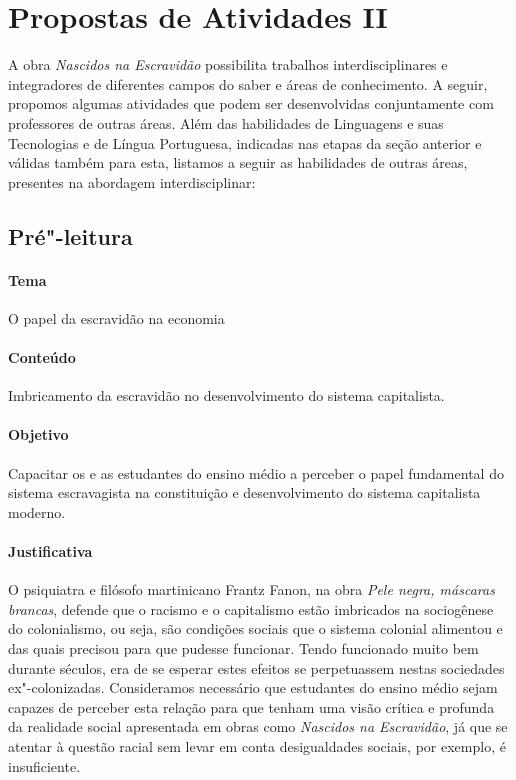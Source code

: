 \documentclass[11pt]{extarticle}
\begin{document}


\section{Propostas de Atividades II}

A obra \emph{Nascidos na Escravidão} possibilita trabalhos
interdisciplinares e integradores de diferentes campos do saber e áreas
de conhecimento. A seguir, propomos algumas atividades que podem ser
desenvolvidas conjuntamente com professores de outras áreas. Além das
habilidades de Linguagens e suas Tecnologias e de Língua Portuguesa,
indicadas nas etapas da seção anterior e válidas também para esta,
listamos a seguir as habilidades de outras áreas, presentes na abordagem
interdisciplinar:

\subsection{Pré"-leitura}

\paragraph{Tema} O papel da escravidão na economia

\paragraph{Conteúdo} Imbricamento da escravidão no desenvolvimento do sistema capitalista.

\paragraph{Objetivo} Capacitar os e as estudantes do ensino médio a perceber o papel fundamental
do sistema escravagista na constituição e desenvolvimento do sistema capitalista moderno.

\paragraph{Justificativa} O psiquiatra e filósofo martinicano Frantz Fanon, na obra \emph{Pele negra,
máscaras brancas}, defende que o racismo e o capitalismo estão imbricados na sociogênese 
do colonialismo, ou seja, são condições sociais que o sistema colonial alimentou e das 
quais precisou para que pudesse funcionar. Tendo funcionado muito bem durante séculos, 
era de se esperar estes efeitos se perpetuassem nestas sociedades ex"-colonizadas. 
Consideramos necessário que estudantes do ensino médio sejam capazes de perceber 
esta relação para que tenham uma visão crítica e profunda da realidade social
apresentada em obras como \emph{Nascidos na Escravidão}, já que se atentar à questão
racial sem levar em conta desigualdades sociais, por exemplo, é insuficiente. 
\end{document}
